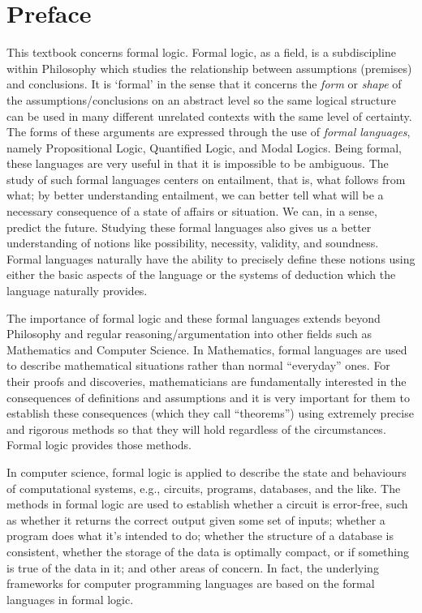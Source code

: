 \chapter{Preface}

This textbook concerns formal logic. Formal logic, as a field, is a subdiscipline within Philosophy which studies the relationship between assumptions (premises) and conclusions. It is `formal' in the sense that it concerns the \emph{form} or \emph{shape} of the assumptions/conclusions on an abstract level so the same logical structure can be used in many different unrelated contexts with the same level of certainty. The forms of these arguments are expressed through the use of \emph{formal languages}, namely Propositional Logic, Quantified Logic, and Modal Logics. Being formal, these languages are very useful in that it is impossible to be ambiguous. The study of such formal languages centers on entailment, that is, what follows from what; by better understanding entailment, we can better tell what will be a necessary consequence of a state of affairs or situation. We can, in a sense, predict the future. Studying these formal languages also gives us a better understanding of notions like possibility, necessity, validity, and soundness. Formal languages naturally have the ability to precisely define these notions using either the basic aspects of the language or the systems of deduction which the language naturally provides.

The importance of formal logic and these formal languages extends beyond Philosophy and regular reasoning/argumentation into other fields such as Mathematics and Computer Science. In Mathematics, formal languages are used to describe mathematical situations rather than normal ``everyday'' ones. For their proofs and discoveries, mathematicians are fundamentally interested in the consequences of definitions and assumptions and it is very important for them to establish these consequences (which they call ``theorems'') using extremely precise and rigorous methods so that they will hold regardless of the circumstances. Formal logic provides those methods. 

In computer science, formal logic is applied to describe the state and behaviours of computational systems, e.g., circuits, programs, databases, and the like. The methods in formal logic are used to establish whether a circuit is error-free, such as whether it returns the correct output given some set of inputs; whether a program does what it's intended to do; whether the structure of a database is consistent, whether the storage of the data is optimally compact, or if something is true of the data in it; and other areas of concern. In fact, the underlying frameworks for computer programming languages are based on the formal languages in formal logic. 

